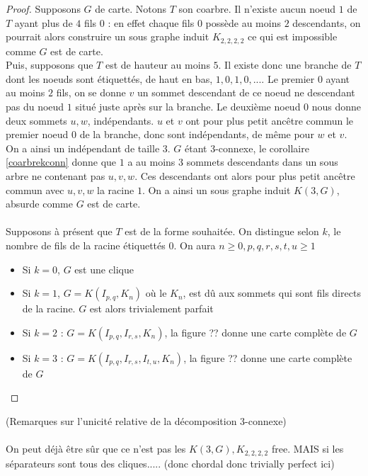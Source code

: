 \documentclass{scrartcl}
\begin{document}
\begin{flushleft}
\begin{proof}
    Supposons $G$ de carte. Notons $T$ son coarbre. Il n'existe aucun noeud $1$ de $T$ ayant plus de $4$ fils $0$ : en effet chaque fils $0$
    possède au moins $2$ descendants, on pourrait alors construire un sous graphe induit $K_{2,2,2,2}$ ce qui est impossible comme $G$ est de carte.\\
    Puis, supposons que $T$ est de hauteur au moins $5$. Il existe donc une branche de $T$ dont les noeuds sont étiquettés, de haut en bas,
    $1, 0, 1, 0, ...$. Le premier $0$ ayant au moins $2$ fils, on se donne $v$ un sommet descendant de ce noeud ne descendant pas
    du noeud $1$ situé juste après sur la branche. Le deuxième noeud $0$ nous donne deux sommets $u, w$, indépendants. $u$ et $v$ ont pour
    plus petit ancêtre commun le premier noeud $0$ de la branche, donc sont indépendants, de même pour $w$ et $v$. On a ainsi un indépendant
    de taille $3$. $G$ étant $3$-connexe, le corollaire \ref{coarbrekconn} donne que $1$ a au moins $3$ sommets descendants dans un sous arbre ne
    contenant pas $u,v,w$. Ces descendants ont alors pour plus petit ancêtre commun avec $u,v,w$ la racine $1$.
    On a ainsi un sous graphe induit $K(3, G)$, absurde comme $G$ est de carte.
    \\~\\
    Supposons à présent que $T$ est de la forme souhaitée. On distingue selon $k$, le nombre de fils de la racine étiquettés $0$.
    On aura $n \geq 0, p,q,r,s,t,u \geq 1$
    \begin{itemize}
        \item Si $k = 0$, $G$ est une clique
        \item Si $k = 1$, $G = K(I_{p,q}, K_n)$ où le $K_n$, est dû aux sommets qui sont fils directs de la racine.
        $G$ est alors trivialement parfait
        \item Si $k = 2$ : $G = K(I_{p,q}, I_{r,s}, K_n)$, la figure ?? donne une carte complète de $G$
        \item Si $k = 3$ : $G = K(I_{p,q}, I_{r,s}, I_{t,u}, K_n)$, la figure ?? donne une carte complète de $G$
    \end{itemize}
\end{proof}

(Remarques sur l'unicité relative de la décomposition $3$-connexe)
\\~\\
On peut déjà être sûr que ce n'est pas les $K(3, G), K_{2,2,2,2}$ free. MAIS si les séparateurs sont tous des cliques..... (donc chordal donc
trivially perfect ici)


\end{flushleft}
\end{document}
